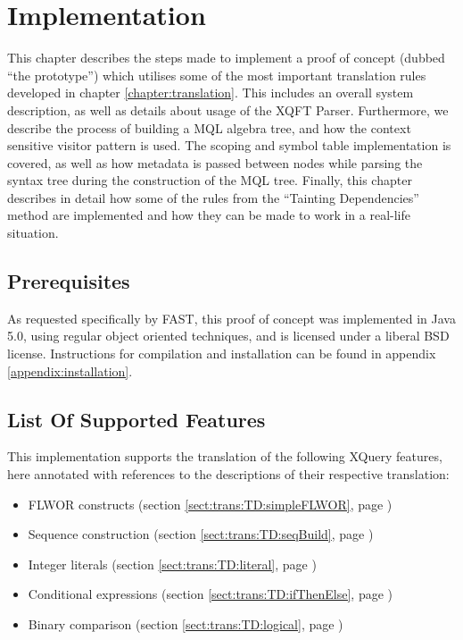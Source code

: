 \chapter{Implementation}
\label{chapter:implementation}
This chapter describes the steps made to implement a proof of concept (dubbed
``the prototype'') which utilises some of the most important translation
rules developed in chapter \ref{chapter:translation}. This includes an overall system
description, as well as details about usage of the XQFT Parser. Furthermore, we
describe the process of building a MQL algebra tree, and how the context
sensitive visitor pattern is used. The scoping and symbol table implementation
is covered, as well as how metadata is passed between nodes while parsing the
syntax tree during the construction of the MQL tree. Finally, this chapter describes in
detail how some of the rules from the ``Tainting Dependencies'' method are
implemented and how they can be made to work in a real-life situation.

\section{Prerequisites}
As requested specifically by FAST, this proof of concept was implemented
in Java 5.0, using regular object oriented techniques, and is licensed under a
liberal BSD license. Instructions for compilation and installation can be
found in appendix \ref{appendix:installation}.

\section{List Of Supported Features}
This implementation supports the translation of the following XQuery features,
here annotated with references to the descriptions of their respective
translation:
\begin{itemize}
  \item FLWOR constructs (section \ref{sect:trans:TD:simpleFLWOR}, page
  \pageref{sect:trans:TD:simpleFLWOR})
  \item Sequence construction (section \ref{sect:trans:TD:seqBuild}, page
  \pageref{sect:trans:TD:seqBuild})
  \item Integer literals (section \ref{sect:trans:TD:literal}, page
  \pageref{sect:trans:TD:literal})
  \item Conditional expressions (section \ref{sect:trans:TD:ifThenElse}, page
  \pageref{sect:trans:TD:ifThenElse})
  \item Binary comparison (section \ref{sect:trans:TD:logical}, page
  \pageref{sect:trans:TD:logical})
\end{itemize}

